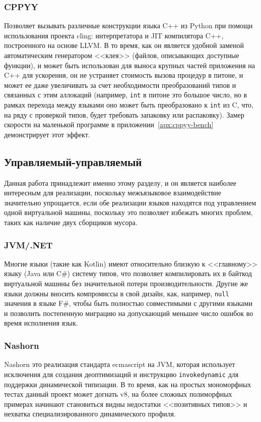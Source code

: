 \documentclass[times
]{itmo-student-thesis}
\begin{document}
\subsubsection{CPPYY}
Позволяет вызывать различные конструкции языка C++ из Python при помощи использования проекта cling: интерпретатора и JIT компилятора C++, построенного на основе LLVM. В то время, как он является удобной заменой автоматическим генератором <<клея>> (файлов, описывающих доступные функции), и может быть использован для выноса крупных частей приложения на C++ для ускорения, он не устраняет стоимость вызова процедур в питоне, и может ее даже увеличивать за счет необходимости преобразований типов и связанных с этим аллокаций (например, \texttt{int} в питоне это большое число, но в рамках перехода между языками оно может быть преобразовано к \texttt{int} из C, что, на ряду с проверкой типов, будет требовать запаковку или распаковку). Замер скорости на маленькой программе в приложении~\ref{apx:cppyy-bench} демонстрирует этот эффект.

\subsection{Управляемый-управляемый}
Данная работа принадлежит именно этому разделу, и он является наиболее интересным для реализации, поскольку межъязыковое взаимодействие значительно упрощается, если обе реализации языков находятся под управлением одной виртуальной машины, поскольку это позволяет избежать многих проблем, таких как наличие двух сборщиков мусора.
\subsubsection{JVM/.NET}
Многие языки (такие как Kotlin) имеют относительно близкую к <<главному>> языку (Java или C\#) систему типов, что позволяет компилировать их в байткод виртуальной машины без значительной потери производительности. Другие же языки должны вносить компромиссы в свой дизайн, как, например, \texttt{null} значения в языке F\#, чтобы быть полностью совместимыми с другими языками и позволить постепенную миграцию на допускающий меньшее число ошибок во время исполнения язык.
\subsubsection{Nashorn}
Nashorn это реализация стандарта ecmascript на JVM, которая использует исключения для создания деоптимизаций и инструкцию \texttt{invokedynamic} для поддержки динамической типизации. В то время, как на простых мономорфных тестах данный проект может догнать v8, на более сложных полиморфных примерах начинают становиться видны недостатки <<позитивных типов>> и нехватка специализированного динамического профиля.
\end{document}
